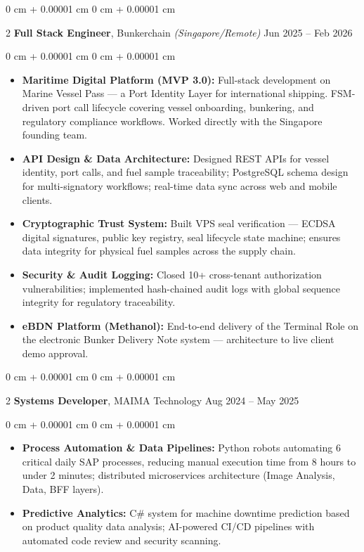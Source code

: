 \documentclass[10pt, letterpaper]{article}
\newenvironment{highlights}{ \begin{itemize}[ topsep=0.10 cm, parsep=0.10 cm, partopsep=0pt,
itemsep=0pt, leftmargin=0 cm + 10pt ] }{ \end{itemize} }
\newenvironment{onecolentry}{ \begin{adjustwidth}{ 0 cm + 0.00001 cm }{ 0 cm + 0.00001 cm }
}{ \end{adjustwidth} }
\newenvironment{twocolentry}[2][]{ \onecolentry \def\secondColumn{#2} \setcolumnwidth{\fill, 4.5 cm}
\begin{paracol}{2} }{ \switchcolumn \raggedleft \secondColumn \end{paracol}
\endonecolentry }
\begin{document}
    \vspace{0.2 cm}

    \begin{twocolentry}
		{ Jun 2025 -- Feb 2026 } \textbf{Full Stack Engineer}, Bunkerchain \textit{(Singapore/Remote)}
	\end{twocolentry}

	\vspace{0.10 cm}
	\begin{onecolentry}
		\begin{highlights}
			\item \textbf{Maritime Digital Platform (MVP 3.0):} Full-stack development on Marine Vessel Pass --- a Port Identity Layer for international shipping. FSM-driven port call lifecycle covering vessel onboarding, bunkering, and regulatory compliance workflows. Worked directly with the Singapore founding team.
            \item \textbf{API Design \& Data Architecture:} Designed REST APIs for vessel identity, port calls, and fuel sample traceability; PostgreSQL schema design for multi-signatory workflows; real-time data sync across web and mobile clients.
            \item \textbf{Cryptographic Trust System:} Built VPS seal verification --- ECDSA digital signatures, public key registry, seal lifecycle state machine; ensures data integrity for physical fuel samples across the supply chain.
            \item \textbf{Security \& Audit Logging:} Closed 10+ cross-tenant authorization vulnerabilities; implemented hash-chained audit logs with global sequence integrity for regulatory traceability.
			\item \textbf{eBDN Platform (Methanol):} End-to-end delivery of the Terminal Role on the electronic Bunker Delivery Note system --- architecture to live client demo approval.
		\end{highlights}
	\end{onecolentry}

	\vspace{0.2 cm}

	\begin{twocolentry}
		{ Aug 2024 -- May 2025 } \textbf{Systems Developer}, MAIMA Technology
	\end{twocolentry}

	\vspace{0.10 cm}
	\begin{onecolentry}
		\begin{highlights}
			\item \textbf{Process Automation \& Data Pipelines:} Python robots automating 6 critical daily SAP processes, reducing manual execution time from 8 hours to under 2 minutes; distributed microservices architecture (Image Analysis, Data, BFF layers).
			\item \textbf{Predictive Analytics:} C\# system for machine downtime prediction based on product quality data analysis; AI-powered CI/CD pipelines with automated code review and security scanning.
		\end{highlights}
	\end{onecolentry}
\end{document}
